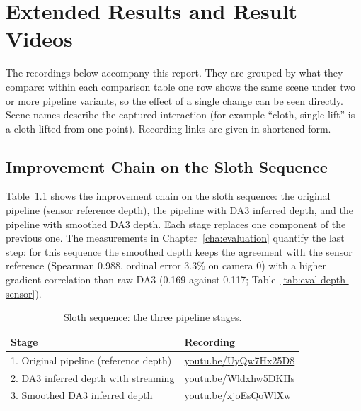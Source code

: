 \appendix

\chapter{Extended Results and Result Videos}
\label{app:results}

The recordings below accompany this report. They are grouped by what they compare: within each
comparison table one row shows the same scene under two or more pipeline variants, so the effect of
a single change can be seen directly. Scene names describe the captured interaction (for example
``cloth, single lift'' is a cloth lifted from one point). Recording links are given in shortened
form.

\section{Improvement Chain on the Sloth Sequence}
\label{sec:app-vid-sloth-chain}

Table~\ref{tab:app-vid-sloth} shows the improvement chain on the sloth sequence: the original
pipeline (sensor reference depth), the pipeline with DA3 inferred depth, and the pipeline with
smoothed DA3 depth. Each stage replaces one component of the previous one. The measurements in
Chapter~\ref{cha:evaluation} quantify the last step: for this sequence the smoothed depth keeps the
agreement with the sensor reference (Spearman 0.988, ordinal error 3.3\% on camera 0) with a higher
gradient correlation than raw DA3 (0.169 against 0.117; Table~\ref{tab:eval-depth-sensor}).

\begin{table}[H]
    \caption{Sloth sequence: the three pipeline stages.}
    \label{tab:app-vid-sloth}
    \begin{center}
        \small
        \begin{tabular}{@{}p{6.2cm}l@{}} \toprule
            Stage & Recording \\ \midrule
            1. Original pipeline (reference depth) & \url{youtu.be/UyQw7Hx25D8} \\
            2. DA3 inferred depth with streaming   & \url{youtu.be/Wldxhw5DKHs} \\
            3. Smoothed DA3 inferred depth         & \url{youtu.be/xjoEsQoWlXw} \\ \bottomrule
        \end{tabular}
    \end{center}
\end{table}

